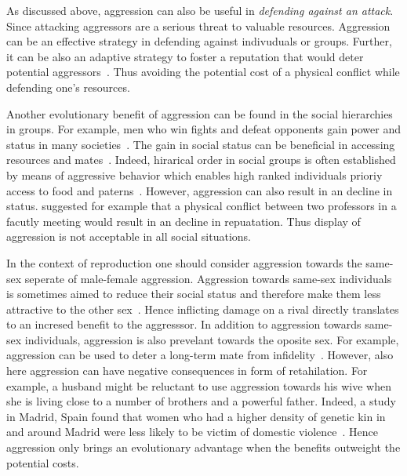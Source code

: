 As discussed above, aggression can also be useful in \textit{defending against an attack}.
Since attacking aggressors are a serious threat to valuable resources.
Aggression can be an effective strategy in defending against indivuduals or groups.
Further, it can be also an adaptive strategy to foster a reputation that would deter potential aggressors~\cite{Buss1997}.
Thus avoiding the potential cost of a physical conflict while defending one's resources.

Another evolutionary benefit of aggression can be found in the social hierarchies in groups.
For example, men who win fights and defeat opponents gain power and status in many societies~\cite{Hill1996}.
The gain in social status can be beneficial in accessing resources and mates~\cite{Archer2009}.
Indeed, hirarical order in social groups is often established by means of aggressive behavior which enables high ranked individuals prioriy access to food and paterns~\cite{Lindenfors2011}. 
However, aggression can also result in an decline in status.
\citet{Buss1997} suggested for example that a physical conflict between two professors in a facutly meeting would result in an decline in repuatation.
Thus display of aggression is not acceptable in all social situations.

In the context of reproduction one should consider aggression towards the same-sex seperate of male-female aggression.
Aggression towards same-sex individuals is sometimes aimed to reduce their social status and therefore make them less attractive to the other sex~\cite{Buss1990}.
Hence inflicting damage on a rival directly translates to an incresed benefit to the aggresssor.
In addition to aggression towards same-sex individuals, aggression is also prevelant towards the oposite sex.
For example, aggression can be used to deter a long-term mate from infidelity~\cite{Daly1982}.
However, also here aggression can have negative consequences in form of retahilation.
For example, a husband might be reluctant to use aggression towards his wive when she is living close to a number of brothers and a powerful father.
Indeed, a study in Madrid, Spain found that women who had a higher density of genetic kin in and around Madrid were less likely to be victim of domestic violence~\cite{Figueredo1995}.
Hence aggression only brings an evolutionary advantage when the benefits outweight the potential costs.

